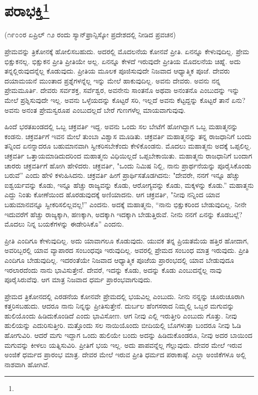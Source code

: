 
\chapter{ಪರಾಭಕ್ತಿ\protect\footnote{}}

\begin{center}
(೧೯೦೦ರ ಏಪ್ರಿಲ್ ೧೨ ರಂದು ಸ್ಯಾನ್‌ಫ್ರಾನ್ಸಿಸ್ಕೋ ಪ್ರದೇಶದಲ್ಲಿ ನೀಡಿದ ಪ್ರವಚನ)
\end{center}

ಪ್ರೇಮವನ್ನು ತ್ರಿಕೋನಕ್ಕೆ ಹೋಲಿಸಬಹುದು. ಅದರಲ್ಲಿ ಮೊದಲನೆಯ ಕೋನವೆ ಪ್ರೀತಿ. ಏನನ್ನೂ ಕೇಳುವುದಿಲ್ಲ. ಪ್ರೇಮ ಭಿಕ್ಷುಕನಲ್ಲ. ಭಿಕ್ಷುಕನ ಪ್ರೀತಿ ಪ್ರೀತಿಯೇ ಅಲ್ಲ. ಏನನ್ನೂ ಕೇಳದೆ ಇರುವುದೇ ಪ್ರೀತಿಯ ಮೊದಲನೆಯ ಚಿಹ್ನೆ. ಅದು ತನ್ನಲ್ಲಿರುವುದನ್ನೆಲ್ಲ ಕೊಡುವುದು. ಪ್ರೀತಿಯ ಮೂಲಕ ಪೂಜಿಸುವುದೇ ನಿಜವಾದ ಆಧ್ಯಾತ್ಮಿಕ ಪೂಜೆ. ದೇವರು ದಯಾಮಯನೆ ಮುಂತಾದ ಪ್ರಶ್ನೆಗಳನ್ನೆಲ್ಲ ಇನ್ನು ಮೇಲೆ ಹಾಕುವುದಿಲ್ಲ. ಅವನು ದೇವರು. ಅವನು ನನ್ನ ಪ್ರೇಮಮೂರ್ತಿ. ದೇವರು ಸರ್ವಶಕ್ತ, ಸರ್ವೆಶ್ವರ, ಅವನೇನು ಸಾಂತನೊ ಅಥವಾ ಅನಂತನೊ ಎಂಬುದನ್ನು ಇನ್ನು ಮೇಲೆ ಪ್ರಶ್ನಿಸುವುದೇ ಇಲ್ಲ. ಅವನು ಒಳ್ಳೆಯದನ್ನು ಕೊಟ್ಟರೆ ಸರಿ, ಇಲ್ಲದೆ ಅವನು ಕೆಟ್ಟದ್ದನ್ನು ಕೊಟ್ಟರೆ ತಾನೆ ಏನು? ಅವನು ಅನಂತ ಪ್ರೇಮಸ್ವರೂಪ ಎಂಬುದಲ್ಲದೆ ಬೇರೆ ಗುಣಗಳೆಲ್ಲ ಮಾಯವಾಗುವುವು.

ಹಿಂದೆ ಭರತಖಂಡದಲ್ಲಿ ಒಬ್ಬ ಚಕ್ರವರ್ತಿ ಇದ್ದ. ಅವನು ಒಂದು ಸಲ ಬೇಟೆಗೆ ಹೋಗಿದ್ದಾಗ ಒಬ್ಬ ಮಹಾತ್ಮನನ್ನು ಕಂಡನು. ಚಕ್ರವರ್ತಿಗೆ ಇವನ ಮೇಲೆ ತುಂಬಾ ವಿಶ್ವಾಸ ಮೂಡಿತು. ಚಕ್ರವರ್ತಿ ಮಹಾತ್ಮನನ್ನು ತನ್ನ ರಾಜಧಾನಿಗೆ ಬಂದು ತನ್ನಿಂದ ಏನನ್ನಾದರೂ ಬಹುಮಾನವಾಗಿ ಸ್ವೀಕರಿಸಬೇಕೆಂದು ಕೇಳಿಕೊಂಡನು. ಮೊದಲು ಮಹಾತ್ಮನು ಅದಕ್ಕೆ ಒಪ್ಪಲಿಲ್ಲ. ಚಕ್ರವರ್ತಿ ಒತ್ತಾಯಮಾಡಿದುದರಿಂದ ಮಹಾತ್ಮನು ವಿಧಿಯಿಲ್ಲದೆ ಒಪ್ಪಬೇಕಾಯಿತು. ಮಹಾತ್ಮನು ರಾಜಧಾನಿಗೆ ಬಂದಾಗ ಚಾರರು ಚಕ್ರವರ್ತಿಗೆ ಹೋಗಿ ಹೇಳಿದರು. ಚಕ್ರವರ್ತಿ, "ಒಂದು ನಿಮಿಷ ನಿಲ್ಲಿ, ನಾನು ಪ್ರಾರ್ಥನೆಯನ್ನು ಪೂರೈಸಿಕೊಂಡು ಬರುವೆ'' ಎಂದು ಹೇಳಿ ಕಳುಹಿಸಿದನು. ಚಕ್ರವರ್ತಿ ಹೀಗೆ ಪ್ರಾರ್ಥಿಸತೊಡಗಿದನು: "ದೇವರೇ, ನನಗೆ ಇನ್ನೂ ಹೆಚ್ಚು ಐಶ್ವರ್ಯವನ್ನು ಕೊಡು, ಇನ್ನೂ ಹೆಚ್ಚು ರಾಜ್ಯವನ್ನು ಕೊಡು, ಆರೋಗ್ಯವನ್ನು ಕೊಡು, ಮಕ್ಕಳನ್ನು ಕೊಡು.” ಮಹಾತ್ಮನು ಎದ್ದು ನಿಂತು ಕೋಣೆಯಿಂದ ಹೊರಡುವುದಕ್ಕೆ ಅಣಿಯಾದನು. ಆಗ ಚಕ್ರವರ್ತಿ, "ನೀವು ನನ್ನಿಂದ ಯಾವ ಬಹುಮಾನವನ್ನೂ ಸ್ವೀಕರಿಸಲಿಲ್ಲವಲ್ಲ!'' ಎಂದನು. ಅದಕ್ಕೆ ಮಹಾತ್ಮನು, “ನಾನು ಭಿಕ್ಷುಕರಿಂದ ಬೇಡುವುದಿಲ್ಲ. ನೀನೇ ಇದುವರೆಗೆ ಹೆಚ್ಚು ರಾಜ್ಯಕ್ಕಾಗಿ, ಹಣಕ್ಕಾಗಿ, ಅದಕ್ಕಾಗಿ ಇದಕ್ಕಾಗಿ ಬೇಡುತ್ತಿರುವೆ. ನೀನು ನನಗೆ ಏನನ್ನು ಕೊಡಬಲ್ಲೆ? ಮೊದಲು ನಿನ್ನ ಬಯಕೆಗಳನ್ನು ಈಡೇರಿಸಿಕೊ” ಎಂದನು.

ಪ್ರೀತಿ ಎಂದಿಗೂ ಕೇಳುವುದಿಲ್ಲ. ಅದು ಯಾವಾಗಲೂ ಕೊಡುವುದು. ಯುವಕ ತನ್ನ ಪ್ರಿಯತಮೆಯ ಹತ್ತಿರ ಹೋದಾಗ, ಅವರಿಬ್ಬರಲ್ಲಿ ಯಾವ ವ್ಯಾಪಾರದ ಸಂಬಂಧವೂ ಇರುವುದಿಲ್ಲ. ಅವರಲ್ಲಿ ಪ್ರೇಮದ ಸಂಬಂಧ ಮಾತ್ರ ಇರುವುದು. ಪ್ರೀತಿ ಎಂದಿಗೂ ಬೇಡುವುದಿಲ್ಲ. ಇದರಂತೆಯೇ ನಿಜವಾದ ಆಧ್ಯಾತ್ಮಿಕ ಪೂಜೆಯ ಪ್ರಾರಂಭದಲ್ಲಿ ಯಾವ ಬೇಡುವುದೂ ಇರಲಾರದೆಂದು ನಾನು ಭಾವಿಸುತ್ತೇನೆ. ದೇವರೆ, ಇದನ್ನು ಕೊಡು, ಅದನ್ನು ಕೊಡು ಎಂಬುದನ್ನೆಲ್ಲ ನಾವು ಪೂರೈಸಿರುವೆವು. ಆಗ ಮಾತ್ರ ನಿಜವಾದ ಧರ್ಮ ಪ್ರಾರಂಭವಾಗುವುದು.

ಪ್ರೇಮದ ತ್ರಿಕೋನದಲ್ಲಿ ಎರಡನೆಯ ಕೋನವೇ ಪ್ರೇಮದಲ್ಲಿ ಭಯವಿಲ್ಲ ಎಂಬುದು. ನೀನು ನನ್ನನ್ನು ಚೂರುಚೂರಾಗಿ ಕತ್ತರಿಸಬಹುದು. ಆದರೂ ನಾನು ನಿನ್ನನ್ನು ಪ್ರೀತಿಸುತ್ತೇನೆ. ದುರ್ಬಲ ಹೆಂಗಸರಾದ ನಿಮ್ಮಲ್ಲಿ ಒಬ್ಬರ ಮಗುವನ್ನು ಹುಲಿಯೊಂದು ಹಿಡಿದುಕೊಂಡಿದೆ ಎಂದು ಭಾವಿಸೋಣ. ಆಗ ನೀವು ಎಲ್ಲಿ ಇರುತ್ತೀರಿ ಎಂಬುದು ಗೊತ್ತು. ನೀವು ಹುಲಿಯನ್ನು ಎದುರಿಸುತ್ತೀರಿ. ಮತ್ತೊಂದು ಸಲ ನಾಯಿಯೊಂದು ಬೀದಿಯಲ್ಲಿ ಬೊಗಳುತ್ತಾ ಬಂದರೂ ನೀವು ಓಡಿ ಹೋಗುವಿರಿ. ಆದರೆ ಮಗು ಇದ್ದಾಗ ಒಂದು ಹುಲಿಯೇ ಬಂದು ಅದನ್ನು ಹಿಡಿದುಕೊಂಡರೂ, ನೀವು ಅದರ ಬಾಯಿಂದ ಮಗುವನ್ನು ಕೀಳಲು ಯತ್ನಿಸುವಿರಿ. ಪ್ರೀತಿಗೆ ಭಯ ಇಲ್ಲ. ಅದು ಪಾಪವನ್ನೆಲ್ಲ ಗೆಲ್ಲುವುದು. ದೇವರ ಮೇಲೆ ಇರುವ ಅಂಜಿಕೆ ಧರ್ಮದ ಪ್ರಾರಂಭ ಮಾತ್ರ. ದೇವರ ಮೇಲೆ ಇರುವ ಪ್ರೀತಿ ಧರ್ಮದ ಪರಾಕಾಷ್ಠೆ. ಎಲ್ಲಾ ಅಂಜಿಕೆಗಳೂ ಅಲ್ಲಿ ನಾಶವಾಗಿ ಹೋಗಿವೆ.

